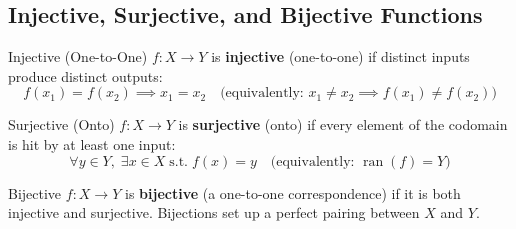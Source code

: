 \documentclass[12pt, a4paper]{article}
\theoremstyle{definition}
\newcommand{\st}{\;\text{s.t.}\;}
\DeclareMathOperator{\ran}{ran}
\begin{document}
\subsection{Injective, Surjective, and Bijective Functions}

\begin{defbox}{Injective (One-to-One)}
$f: X \to Y$ is \textbf{injective} (one-to-one) if distinct inputs produce distinct outputs:
\[
  f(x_1) = f(x_2) \implies x_1 = x_2 \quad \text{(equivalently: } x_1 \neq x_2 \implies f(x_1) \neq f(x_2)\text{)}
\]
\end{defbox}

\begin{defbox}{Surjective (Onto)}
$f: X \to Y$ is \textbf{surjective} (onto) if every element of the codomain is hit by at least one input:
\[
  \forall y \in Y,\; \exists x \in X \st f(x) = y \quad \text{(equivalently: } \ran(f) = Y\text{)}
\]
\end{defbox}

\begin{defbox}{Bijective}
$f: X \to Y$ is \textbf{bijective} (a one-to-one correspondence) if it is both injective and surjective. Bijections set up a perfect pairing between $X$ and $Y$.
\end{defbox}

\medskip
\end{document}
